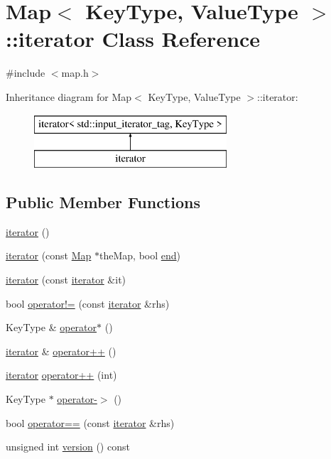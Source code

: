 \hypertarget{classMap_1_1iterator}{}\section{Map$<$ Key\+Type, Value\+Type $>$\+:\+:iterator Class Reference}
\label{classMap_1_1iterator}


{\ttfamily \#include $<$map.\+h$>$}

Inheritance diagram for Map$<$ Key\+Type, Value\+Type $>$\+:\+:iterator\+:\begin{figure}[H]
\begin{center}
\leavevmode
\includegraphics[height=2.000000cm]{classMap_1_1iterator}
\end{center}
\end{figure}
\subsection*{Public Member Functions}
\begin{DoxyCompactItemize}
\item 
\mbox{\hyperlink{classMap_1_1iterator_a67d652c2433cf9217ed2a1485092fdd1}{iterator}} ()
\item 
\mbox{\hyperlink{classMap_1_1iterator_a963233ec2eced24db44f8d6296317091}{iterator}} (const \mbox{\hyperlink{classMap}{Map}} $\ast$the\+Map, bool \mbox{\hyperlink{classMap_a68b688a51bd0cf6fb5bc2cba292209a8}{end}})
\item 
\mbox{\hyperlink{classMap_1_1iterator_a698b7553261e7209d6c29fb55627dce4}{iterator}} (const \mbox{\hyperlink{classMap_1_1iterator}{iterator}} \&it)
\item 
bool \mbox{\hyperlink{classMap_1_1iterator_ae1983f2cb0df1f0cbe77ac29590e2e2b}{operator!=}} (const \mbox{\hyperlink{classMap_1_1iterator}{iterator}} \&rhs)
\item 
Key\+Type \& \mbox{\hyperlink{classMap_1_1iterator_a26107e2ced3252ee2bf81dd666739da7}{operator$\ast$}} ()
\item 
\mbox{\hyperlink{classMap_1_1iterator}{iterator}} \& \mbox{\hyperlink{classMap_1_1iterator_af1b1c7856a59f34c7d3570f946a2ff00}{operator++}} ()
\item 
\mbox{\hyperlink{classMap_1_1iterator}{iterator}} \mbox{\hyperlink{classMap_1_1iterator_a538d230f8b52d2bc0950e26ce74ec239}{operator++}} (int)
\item 
Key\+Type $\ast$ \mbox{\hyperlink{classMap_1_1iterator_a917c74872cce637554f68ebe3c666785}{operator-\/$>$}} ()
\item 
bool \mbox{\hyperlink{classMap_1_1iterator_a798956e7a65ef16c891d129b3ced0f9e}{operator==}} (const \mbox{\hyperlink{classMap_1_1iterator}{iterator}} \&rhs)
\item 
unsigned int \mbox{\hyperlink{classMap_1_1iterator_a0aa696ccb72cbf928535d6b646bac1aa}{version}} () const
\end{DoxyCompactItemize}
